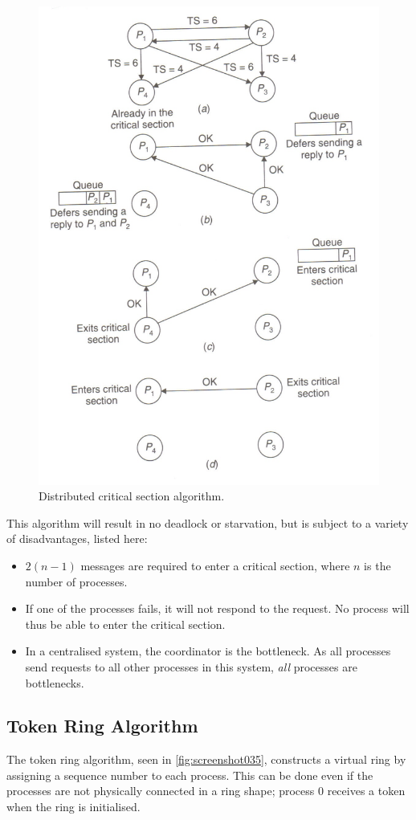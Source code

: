 \begin{figure}
\centering
\includegraphics[width=0.7\linewidth]{screenshot034}
\caption{Distributed critical section algorithm.}
\label{fig:screenshot034}
\end{figure}

This algorithm will result in no deadlock or starvation, but is subject to a variety of disadvantages, listed here: \begin{itemize}
\item $2(n - 1)$ messages are required to enter a critical section, where $n$ is the number of processes.
\item If one of the processes fails, it will not respond to the request. No process will thus be able to enter the critical section.
\item In a centralised system, the coordinator is the bottleneck. As all processes send requests to all other processes in this system, \textit{all} processes are bottlenecks.
\end{itemize}

\subsection{Token Ring Algorithm}
The token ring algorithm, seen in \autoref{fig:screenshot035}, constructs a virtual ring by assigning a sequence number to each process. This can be done even if the processes are not physically connected in a ring shape; process $0$ receives a token when the ring is initialised.

